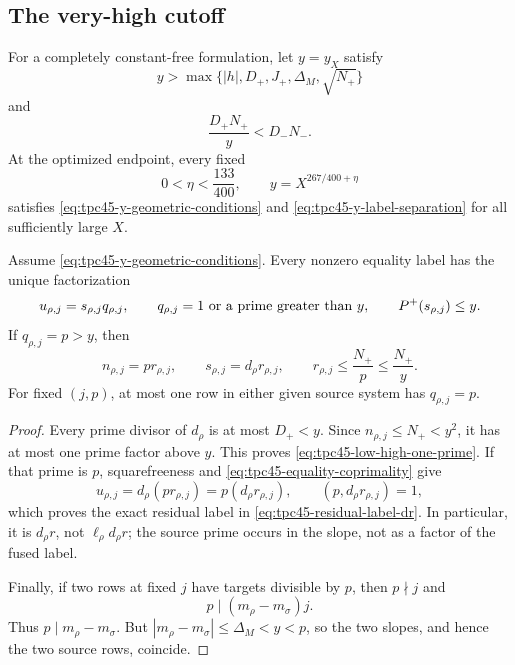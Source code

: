 \subsection{The very-high cutoff}

For a completely constant-free formulation, let \(y=y_X\) satisfy
\begin{equation}
 y>\max\{|h|,D_+,J_+,\Delta_M,\sqrt{N_+}\}
 \label{eq:tpc45-y-geometric-conditions}
\end{equation}
and
\begin{equation}
 \frac{D_+N_+}{y}<D_-N_-.
 \label{eq:tpc45-y-label-separation}
\end{equation}
At the optimized endpoint, every fixed
\begin{equation}
 0<\eta<\frac{133}{400},
 \qquad
 \boxed{y=X^{267/400+\eta}}
 \label{eq:tpc45-very-high-y}
\end{equation}
satisfies \eqref{eq:tpc45-y-geometric-conditions} and
\eqref{eq:tpc45-y-label-separation} for all sufficiently large \(X\).

\begin{theorem}
\label{thm:tpc45-unique-very-high-prime}
Assume \eqref{eq:tpc45-y-geometric-conditions}.  Every nonzero equality
label has the unique factorization
\begin{equation}
 u_{\rho,j}=s_{\rho,j}q_{\rho,j},
 \qquad
 q_{\rho,j}=1\ \text{or a prime greater than \(y\)},
 \qquad
 P^{+}(s_{\rho,j})\le y.
 \label{eq:tpc45-low-high-one-prime}
\end{equation}
If \(q_{\rho,j}=p>y\), then
\begin{equation}
 n_{\rho,j}=pr_{\rho,j},
 \qquad
 \boxed{s_{\rho,j}=d_\rho r_{\rho,j}},
 \qquad
 r_{\rho,j}\le\frac{N_+}{p}\le\frac{N_+}{y}.
 \label{eq:tpc45-residual-label-dr}
\end{equation}
For fixed \((j,p)\), at most one row in either given source system has
\(q_{\rho,j}=p\).
\end{theorem}

\begin{proof}
Every prime divisor of \(d_\rho\) is at most \(D_+<y\).  Since
\(n_{\rho,j}\le N_+<y^2\), it has at most one prime factor above \(y\).
This proves \eqref{eq:tpc45-low-high-one-prime}.  If that prime is
\(p\), squarefreeness and
\eqref{eq:tpc45-equality-coprimality} give
\begin{equation}
 u_{\rho,j}=d_\rho(pr_{\rho,j})
 =p(d_\rho r_{\rho,j}),
 \qquad (p,d_\rho r_{\rho,j})=1,
 \label{eq:tpc45-u-pdr}
\end{equation}
which proves the exact residual label in
\eqref{eq:tpc45-residual-label-dr}.  In particular, it is \(d_\rho r\),
not \(\ell_\rho d_\rho r\); the source prime occurs in the slope, not as
a factor of the fused label.

Finally, if two rows at fixed \(j\) have targets divisible by \(p\),
then \(p\nmid j\) and
\begin{equation}
 p\mid(m_\rho-m_\sigma)j.
 \label{eq:tpc45-p-divides-row-gap}
\end{equation}
Thus \(p\mid m_\rho-m_\sigma\).  But
\(|m_\rho-m_\sigma|\le\Delta_M<y<p\), so the two slopes, and hence the
two source rows, coincide.
\end{proof}

